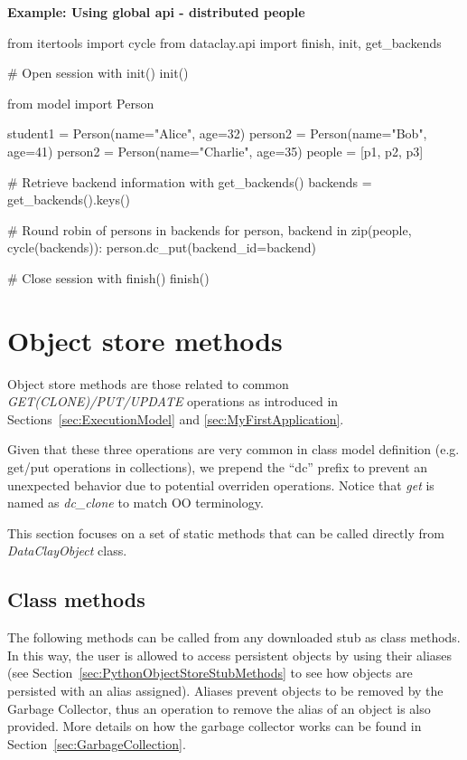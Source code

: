 \begin{tBox}
\textcolor{basecolor} {\bf Example: Using global api - distributed people}
\begin{python}
from itertools import cycle
from dataclay.api import finish, init, get_backends

# Open session with init()
init()

from model import Person

student1 = Person(name="Alice", age=32)
person2 = Person(name="Bob", age=41)
person2 = Person(name="Charlie", age=35)
people = [p1, p2, p3]

# Retrieve backend information with get_backends()
backends = get_backends().keys()

# Round robin of persons in backends
for person, backend in zip(people, cycle(backends)):
    person.dc_put(backend_id=backend)

# Close session with finish()
finish()
\end{python}
\end{tBox}


\section{Object store methods}
\label{sec:PythonObjectStore}

Object store methods are those related to common \textit{GET(CLONE)/PUT/UPDATE} operations as introduced in Sections~\ref{sec:ExecutionModel} and \ref{sec:MyFirstApplication}.

Given that these three operations are very common in class model definition (e.g. get/put operations in collections), we prepend the ``dc'' prefix to prevent an unexpected behavior due to potential overriden operations. Notice that \textit{get} is named as \textit{dc\_clone} to match OO terminology.

This section focuses on a set of static methods that can be called directly from \textit{DataClayObject} class.



\subsection{Class methods}
\label{sec:PythonClassMethodsObjectStore}

The following methods can be called from any downloaded stub as class methods. In this way, the user is allowed to access persistent objects by using their aliases (see Section~\ref{sec:PythonObjectStoreStubMethods} to see how objects are persisted with an alias assigned). Aliases prevent objects to be removed by the Garbage Collector, thus an operation to remove the alias of an object is also provided. More details on how the garbage collector works can be found in Section~\ref{sec:GarbageCollection}. 

